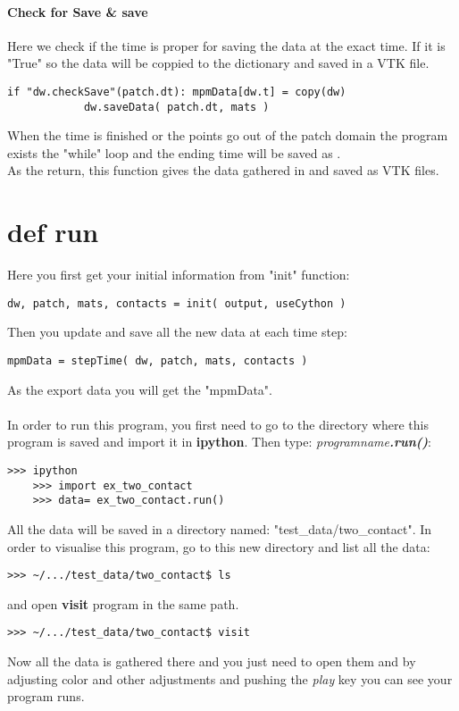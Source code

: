 \documentclass[11pt,fleqn]{book} %
\begin{document}
\paragraph{Check for Save \& save}
Here we check if the time is proper for saving the data at the exact time. If it is "True" so the data will be coppied to the  dictionary and saved in a VTK file.
\begin{lstlisting}
if "dw.checkSave"(patch.dt): mpmData[dw.t] = copy(dw)
            dw.saveData( patch.dt, mats )
\end{lstlisting}

When the time is finished or the points go out of the patch domain the program exists the "while" loop and the ending time will be saved as .\\
As the return, this function gives the data gathered in  and saved as VTK files.
\section{def run}
Here you first get your initial information from "init" function:
\begin{lstlisting}
dw, patch, mats, contacts = init( output, useCython )
\end{lstlisting}
Then you update and save all the new data at each time step:
\begin{lstlisting}
mpmData = stepTime( dw, patch, mats, contacts )
\end{lstlisting}

As the export data you will get the "mpmData".\\ \\ 


In order to run this program, you first need to go to the directory where this program is saved and import it in \textbf{ipython}. Then type: \emph{programname}\textbf{\emph{.run()}}:
\begin{lstlisting}
>>> ipython
	>>> import ex_two_contact
	>>> data= ex_two_contact.run()
\end{lstlisting}
All the data will be saved in a directory named: "test\_data/two\_contact". In order to visualise this program, go to this new directory and list all the data:
\begin{lstlisting}
>>> ~/.../test_data/two_contact$ ls
\end{lstlisting}
and open \textbf{visit} program in the same path. 
\begin{lstlisting}
>>> ~/.../test_data/two_contact$ visit
\end{lstlisting}
Now all the data is gathered there and you just need to open them and by adjusting color and other adjustments and pushing the \emph{play} key you can see your program runs. 
\end{document}

